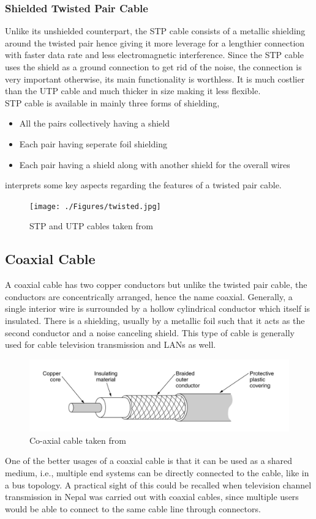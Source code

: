 \documentclass{home_assignment}
\begin{document}
\subsubsection*{Shielded Twisted Pair Cable}
Unlike its unshielded counterpart, the STP cable consists of a metallic shielding around the twisted pair hence giving it more leverage for a lengthier connection with faster data rate and less electromagnetic interference. Since the STP cable uses the shield as a ground connection to get rid of the noise, the connection is very important otherwise, its main functionality is worthless. It is much costlier than the UTP cable and much thicker in size making it less flexible.\\ STP cable is available in mainly three forms of shielding,
\begin{itemize}
\item All the pairs collectively having a shield
\item Each pair having seperate foil shielding
\item Each pair having a shield along with another shield for the overall wires 
\end{itemize}
\cite{yang} interprets some key aspects regarding the features of a twisted pair cable.
\begin{figure}[H]
\centering
\texttt{[image: ./Figures/twisted.jpg]}
\caption{STP and UTP cables taken from \cite{twisted}}
\label{fig:twisted}
\end{figure}
\subsection*{Coaxial Cable}
A coaxial cable has two copper conductors but unlike the twisted pair cable, the conductors are concentrically arranged, hence the name coaxial. Generally, a single interior wire is surrounded by a hollow cylindrical conductor which itself is insulated. There is a shielding, usually by a metallic foil such that it acts as the second conductor and a noise canceling shield. This type of cable is generally used for cable television transmission and LANs as well.\\
\begin{figure}[H]
\centering
\includegraphics[scale=1]{./Figures/coaxial.jpg}
\caption{Co-axial cable taken from \cite{coaxial}}
\label{fig:coaxial}
\end{figure}
One of the better usages of a coaxial cable is that it can be used as a shared medium, i.e., multiple end systems can be directly connected to the cable, like in a bus topology. A practical sight of this could be recalled when television channel transmission in Nepal was carried out with coaxial cables, since multiple users would be able to connect to the same cable line through connectors.
\end{document}
